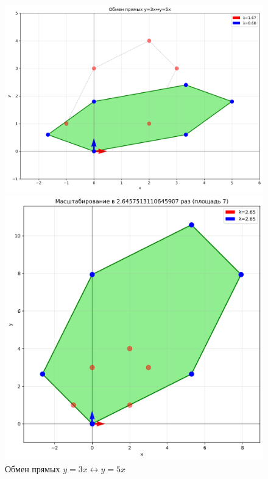 \begin{figure}[h]
\centering
\begin{minipage}{0.31\textwidth}
\centering
\includegraphics[width=\textwidth]{images/task1/transformation_8.png}
\caption{Обмен прямых $y = 3x \leftrightarrow y = 5x$}
\label{fig:transformation_8}
\end{minipage}
\hfill
\begin{minipage}{0.31\textwidth}
\centering
\includegraphics[width=\textwidth]{images/task1/scaling_c.png}

\end{minipage}
\end{figure}
